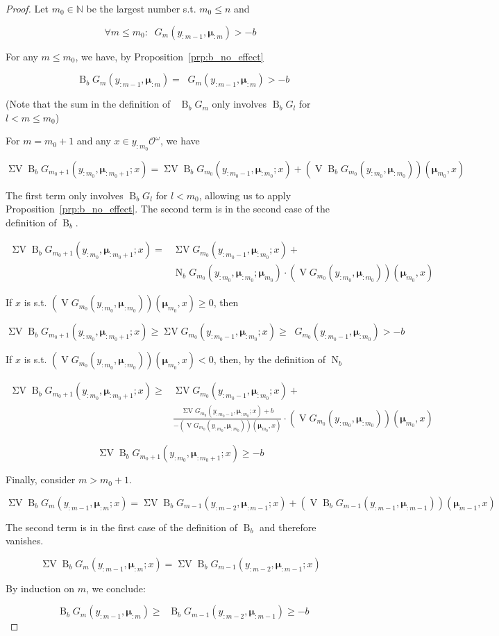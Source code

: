 \documentclass[11pt]{article}
\theoremstyle{definition}
\theoremstyle{plain}
\newcommand{\Nats}{\mathbb{N}}
\newcommand{\B}{\operatorname{B}}
\newcommand{\Ob}{\mathcal{O}}
\newcommand{\OO}{\Ob^\omega}
\DeclareMathOperator{\V}{V}
\DeclareMathOperator{\SV}{\Sigma V}
\DeclareMathOperator{\SVM}{\Sigma V_{\min}}
\DeclareMathOperator{\Nr}{N}
\newcommand{\BM}{\bm{\mu}}
\begin{document}
\begin{proof}

Let ${m_0 \in \Nats}$ be the largest number s.t. ${m_0 \leq n}$ and 

$$\forall m \leq m_0: \SVM G_m(y_{:m-1},\BM_{:m}) > -b$$

For any ${m \leq m_0}$, we have, by Proposition~\ref{prp:b_no_effect}

$$\SVM \B_b G_m(y_{:m-1},\BM_{:m})=\SVM G_m(y_{:m-1},\BM_{:m}) > -b$$

(Note that the sum in the definition of ${\SVM \B_b G_m}$ only involves ${\B_b G_l}$ for ${l < m \leq m_0}$)

For ${m=m_0+1}$ and any $x \in y_{:m_0}\OO$, we have

$$\SV \B_b G_{m_0+1}(y_{:m_0},\BM_{:m_0+1};x) = \SV \B_b G_{m_0}(y_{:m_0-1},\BM_{:m_0};x) + (\V \B_b G_{m_0}(y_{:m_0},\BM_{:m_0}))(\BM_{m_0},x)$$

The first term only involves ${\B_b G_l}$ for ${l < m_0}$, allowing us to apply Proposition~\ref{prp:b_no_effect}. The second term is in the second case of the definition of $\B_b$.

\begin{align*}
\SV \B_b G_{m_0+1}(y_{:m_0},\BM_{:m_0+1};x) = &\SV G_{m_0}(y_{:m_0-1},\BM_{:m_0};x) +\\ &\Nr_b G_{m_0}(y_{:m_0},\BM_{:m_0};\BM_{m_0}) \cdot (\V G_{m_0}(y_{:m_0},\BM_{:m_0}))(\BM_{m_0},x)
\end{align*}

If ${x}$ is s.t. ${(\V G_{m_0}(y_{:m_0},\BM_{:m_0}))(\BM_{m_0},x) \geq 0}$, then

\[\SV \B_b G_{m_0+1}(y_{:m_0},\BM_{:m_0+1};x) \geq \SV G_{m_0}(y_{:m_0-1},\BM_{:m_0};x)\geq \SVM G_{m_0}(y_{:m_0-1},\BM_{:m_0}) > -b\]

If ${x}$ is s.t. ${(\V G_{m_0}(y_{:m_0},\BM_{:m_0}))(\BM_{m_0},x) < 0}$, then, by the definition of $\Nr_b$

\begin{align*}
\SV \B_b G_{m_0+1}(y_{:m_0},\BM_{:m_0+1};x) \geq &\SV G_{m_0}(y_{:m_0-1},\BM_{:m_0};x)+ \\
&\frac{\SV G_{m_0}(y_{:m_0-1},\BM_{:m_0};x) + b}{-(\V G_{m_0}(y_{:m_0},\BM_{:m_0}))(\BM_{m_0},x)} \cdot (\V G_{m_0}(y_{:m_0},\BM_{:m_0}))(\BM_{m_0},x)
\end{align*}

$$\SV \B_b G_{m_0+1}(y_{:m_0},\BM_{:m_0+1};x) \geq -b$$

Finally, consider ${m > m_0 + 1}$.

$$\SV \B_b G_{m}(y_{:m-1},\BM_{:m};x) = \SV \B_b G_{m-1}(y_{:m-2},\BM_{:m-1};x) + (\V \B_b G_{m-1}(y_{:m-1},\BM_{:m-1}))(\BM_{m-1},x)$$

The second term is in the first case of the definition of $\B_b$ and therefore vanishes.

$$\SV \B_b G_{m}(y_{:m-1},\BM_{:m};x) = \SV \B_b G_{m-1}(y_{:m-2},\BM_{:m-1};x)$$

By induction on ${m}$, we conclude:

$$\SVM \B_b G_{m}(y_{:m-1},\BM_{:m}) \geq \SVM \B_b G_{m-1}(y_{:m-2},\BM_{:m-1}) \geq -b$$
\end{proof}
\end{document}
